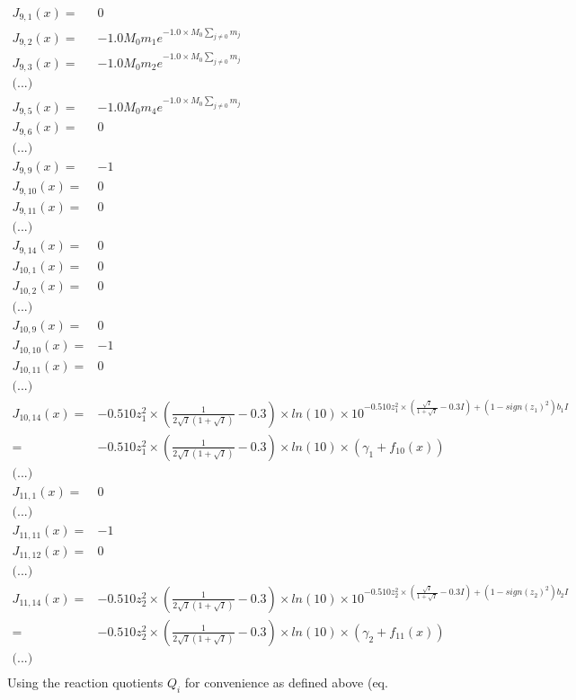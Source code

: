 \documentclass[onecolumn]{article}
\begin{document}
\[
\begin{aligned}
J_{9,1}(x) =&  0\\
J_{9,2}(x) =& -1.0 M_0 m_1 e^{-1.0\times M_0 \sum_{j\neq0}{m_j}}\\
J_{9,3}(x) =& -1.0 M_0 m_2 e^{-1.0\times M_0 \sum_{j\neq0}{m_j}}\\
\text{(...)}\\
J_{9,5}(x) =& -1.0 M_0 m_4 e^{-1.0\times M_0 \sum_{j\neq0}{m_j}}\\
J_{9,6}(x) =& 0\\
\text{(...)}\\
J_{9,9}(x) =& -1\\
J_{9,10}(x) =& 0\\
J_{9,11}(x) =& 0\\
\text{(...)}\\
J_{9,14}(x) =& 0\\
J_{10,1}(x) =& 0\\
J_{10,2}(x) =& 0\\
\text{(...)}\\
J_{10,9}(x) =& 0\\
J_{10,10}(x) =& -1\\
J_{10,11}(x) =& 0\\
\text{(...)}\\
J_{10,14}(x) =&
-0.510 z_1^2\times\left(\frac{1}{2\sqrt{I}(1+\sqrt{I})} -0.3\right)
\times ln(10) \times 10^{- 0.510z_1^2 \times
\left(\frac{\sqrt{I}}{1+\sqrt{I}}-0.3I\right) + (1-sign(z_1)^2)b_1 I}\\
=& -0.510 z_1^2\times\left(\frac{1}{2\sqrt{I}(1+\sqrt{I})} -0.3\right)
 \times ln(10) \times (\gamma_1+f_{10}(x)) \\
\text{(...)}\\
J_{11,1}(x) =& 0\\
\text{(...)}\\
J_{11,11}(x) =& -1\\
J_{11,12}(x) =& 0\\
\text{(...)}\\
J_{11,14}(x) =&
-0.510 z_2^2\times\left(\frac{1}{2\sqrt{I}(1+\sqrt{I})} -0.3\right)
\times ln(10) \times 10^{- 0.510z_2^2 \times
\left(\frac{\sqrt{I}}{1+\sqrt{I}}-0.3I\right) + (1-sign(z_2)^2)b_2 I}\\
=& -0.510 z_2^2\times\left(\frac{1}{2\sqrt{I}(1+\sqrt{I})} -0.3\right)
 \times ln(10) \times (\gamma_2+f_{11}(x)) \\
\text{(...)}\\
\end{aligned}
\]
Using the reaction quotients $Q_i$ for convenience as defined above (eq.
\end{document}
